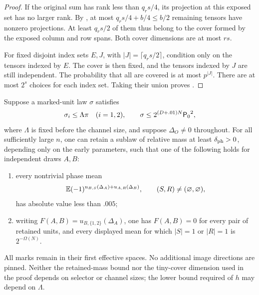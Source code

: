 \begin{proof}
If the original sum has rank less than \(q_rs/4\), its projection
at this exposed set has no larger rank.  By
, at most
\(q_rs/4+b/4\le b/2\) remaining tensors have nonzero projections.
At least \(q_rs/2\) of them thus belong to the cover formed by the
exposed column and row spans.  Both cover dimensions are at most
\(rs\).

For fixed disjoint index sets \(E,J\), with
\(|J|=\lceil q_rs/2\rceil\), condition only on the tensors indexed
by \(E\).  The cover is then fixed, and the tensors indexed by \(J\)
are still independent.  The probability that all are covered is
at most \(p^{|J|}\).  There are at most \(2^s\) choices for each
index set.  Taking their union proves .
\end{proof}

\begin{theorem}
\label{thm:phase-alternative}
Suppose a marked-unit law \(\sigma\) satisfies
\[
 \sigma_i\le\Lambda\pi\quad(i=1,2),\qquad
 \sigma\le2^{(D+.01)N}{\mathsf P_0}^2,
\]
where \(\Lambda\) is fixed before the channel size, and suppose
\(\Delta_O\ne0\) throughout.  For all sufficiently large \(n\),
one can retain a sublaw of relative mass at least
\(\delta_{\rm ph}>0\), depending only on the early parameters,
such that one of the following holds for independent draws \(A,B\):
\begin{enumerate}[label=\textup{(\roman*)}]
\item every nontrivial phase mean
\[
 \mathbb E(-1)^{u_{B,S}(\Delta_A)+u_{A,R}(\Delta_B)},
 \qquad(S,R)\ne(\varnothing,\varnothing),
\]
has absolute value less than \(.005\);
\item writing \(F(A,B)=u_{B,\{1,2\}}(\Delta_A)\), one has
\(F(A,B)=0\) for every pair of retained units, and every displayed
mean for which \(|S|=1\) or \(|R|=1\) is \(2^{-\Omega(N)}\).
\end{enumerate}
All marks remain in their first effective spaces.  No additional
image directions are pinned.  Neither the retained-mass bound nor
the tiny-cover dimension used in the proof depends on selector or
channel sizes; the lower bound required of \(h\) may depend on
\(\Lambda\).
\end{theorem}

